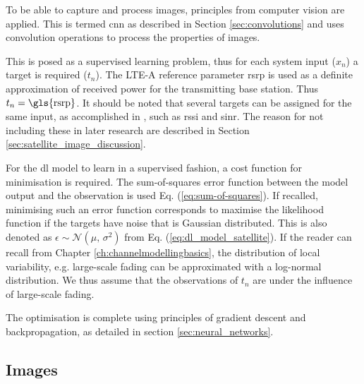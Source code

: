 To be able to capture and process images, principles from computer vision are applied. This is termed \gls{cnn} as described in Section \ref{sec:convolutions} and uses convolution operations to process the properties of images.

This is posed as a supervised learning problem, thus for each system input ($x_n$) a target is required ($t_n$). The LTE-A reference parameter \acrfull{rsrp} is used as a definite approximation of received power for the transmitting base station. Thus $t_n = \text{\gls{rsrp}}$. It should be noted that several targets can be assigned for the same input, as accomplished in \cite{Thrane2018DriveApproximation}, such as \gls{rssi} and \gls{sinr}. The reason for not including these in later research are described in Section \ref{sec:satellite_image_discussion}.

For the \gls{dl} model to learn in a supervised fashion, a cost function for minimisation is required. The sum-of-squares error function between the model output and the observation is used Eq. (\ref{eq:sum-of-squares}). If recalled, minimising such an error function corresponds to maximise the likelihood function if the targets have noise that is Gaussian distributed. This is also denoted as $\epsilon \sim \mathcal{N}(\mu,\,\sigma^{2})$ from Eq. (\ref{eq:dl_model_satellite}). If the reader can recall from Chapter \ref{ch:channelmodellingbasics}, the distribution of local variability, e.g. large-scale fading can be approximated with a log-normal distribution. We thus assume that the observations of $t_n$ are under the influence of large-scale fading.

The optimisation is complete using principles of gradient descent and backpropagation, as detailed in section \ref{sec:neural_networks}.



\subsection{Images}


